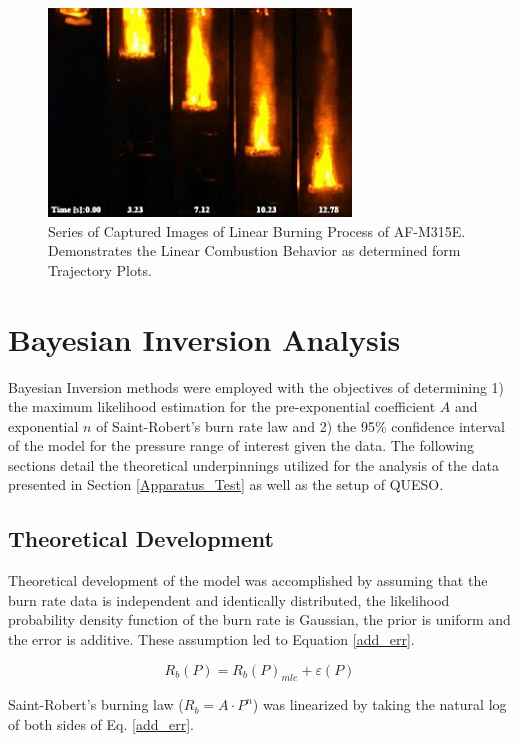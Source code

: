 \documentclass{article}
\begin{document}
\begin{figure}[htb]
\centering
\includegraphics[width=0.25\textheight]{Figure_5.jpg}
\caption{Series of Captured Images of Linear Burning Process of AF-M315E. Demonstrates the Linear Combustion Behavior as determined form Trajectory Plots.}
\label{fig5}
\end{figure}


\section{Bayesian Inversion Analysis} \label{Bayesian_Inv_Analysis}

Bayesian Inversion methods were employed with the objectives of determining 1) the maximum likelihood estimation for
the pre-exponential coefficient $A$ and exponential $n$ of Saint-Robert's burn rate law and 2) the 95\% confidence interval 
of the model for the pressure range of interest given the data. The following sections detail the theoretical 
underpinnings utilized for the analysis of the data presented in Section \ref{Apparatus_Test} as well as the setup of QUESO.

\subsection{Theoretical Development} \label{Theory_Dev}

Theoretical development of the model was accomplished by assuming that the burn rate data is independent and 
identically distributed, the likelihood probability density function of the burn rate is Gaussian, the prior 
is uniform and the error is additive. These assumption led to Equation \ref{add_err}. 

\begin{equation} \label{add_err}
R_b (P)=R_b (P)_{mle} + \varepsilon (P)
\end{equation}

Saint-Robert's burning law ($R_b=A \cdot P^n$) was linearized by taking the natural log of both sides of Eq. \ref{add_err}.
\end{document}
